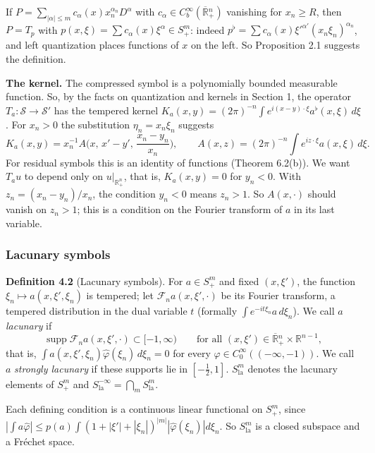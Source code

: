 \documentclass[
  11pt,
]{article}
\begin{document}
If \(P=\sum_{|\alpha|\leq m}c_\alpha(x)x_n^{\alpha_n}D^\alpha\) with
\(c_\alpha\in C^\infty_b(\overline{\mathbb R}{}^n_+)\) vanishing for
\(x_n\geq R\), then \(P=T_p\) with
\(p(x,\xi)=\sum c_\alpha(x)\xi^\alpha\in S^{m}_+\): indeed
\(p^\flat=\sum c_\alpha(x)\xi'^{\alpha'}(x_n\xi_n)^{\alpha_n}\), and
left quantization places functions of \(x\) on the left. So Proposition
2.1 suggests the definition.

\textbf{The kernel.} The compressed symbol is a polynomially bounded
measurable function. So, by the facts on quantization and kernels in
Section 1, the operator \(T_a:\mathcal S\to\mathcal S'\) has the
tempered kernel
\(K_a(x,y)=(2\pi)^{-n}\int e^{i(x-y)\cdot\xi}a^\flat(x,\xi)\,d\xi\). For
\(x_n>0\) the substitution \(\eta_n=x_n\xi_n\) suggests \[
K_a(x,y)=x_n^{-1}A\Big(x,\,x'-y',\,\frac{x_n-y_n}{x_n}\Big),\qquad A(x,z)=(2\pi)^{-n}\int e^{iz\cdot\xi}a(x,\xi)\,d\xi .
\tag{4.4}
\] For residual symbols this is an identity of functions (Theorem
6.2(b)). We want \(T_au\) to depend only on \(u|_{\mathbb R^n_+}\), that
is, \(K_a(x,y)=0\) for \(y_n<0\). With \(z_n=(x_n-y_n)/x_n\), the
condition \(y_n<0\) means \(z_n>1\). So \(A(x,\cdot)\) should vanish on
\(z_n>1\); this is a condition on the Fourier transform of \(a\) in its
last variable.

\subsubsection{Lacunary symbols}\label{lacunary-symbols}

\textbf{Definition 4.2} (Lacunary symbols). For \(a\in S^m_+\) and fixed
\((x,\xi')\), the function \(\xi_n\mapsto a(x,\xi',\xi_n)\) is tempered;
let \(\mathcal F_na(x,\xi',\cdot)\) be its Fourier transform, a tempered
distribution in the dual variable \(t\) (formally
\(\int e^{-it\xi_n}a\,d\xi_n\)). We call \(a\) \emph{lacunary} if \[
\operatorname{supp}\mathcal F_na(x,\xi',\cdot)\subset[-1,\infty)\qquad\text{for all }(x,\xi')\in\overline{\mathbb R}{}^n_+\times\mathbb R^{n-1},
\tag{4.5}
\] that is, \(\int a(x,\xi',\xi_n)\widehat\varphi(\xi_n)\,d\xi_n=0\) for
every \(\varphi\in C_0^\infty((-\infty,-1))\). We call \(a\)
\emph{strongly lacunary} if these supports lie in \([-\tfrac12,1]\).
\(S^m_{\mathrm{la}}\) denotes the lacunary elements of \(S^m_+\) and
\(S^{-\infty}_{\mathrm{la}}=\bigcap_mS^m_{\mathrm{la}}\).

Each defining condition is a continuous linear functional on \(S^m_+\),
since
\(|\int a\widehat\varphi|\leq p(a)\int(1+|\xi'|+|\xi_n|)^{|m|}|\widehat\varphi(\xi_n)|d\xi_n\).
So \(S^m_{\mathrm{la}}\) is a closed subspace and a Fréchet space.
\end{document}
